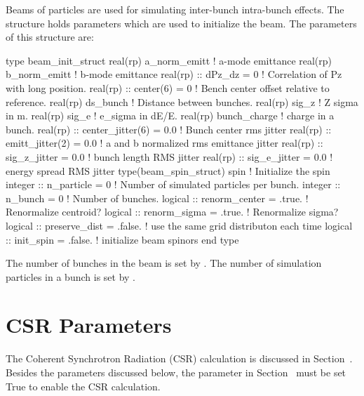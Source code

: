 Beams of particles are used for simulating inter-bunch intra-bunch effects.
The  structure holds parameters which are used to initialize
the beam. The parameters of this structure are:
\begin{example}
  type beam_init_struct
    real(rp) a_norm_emitt     ! a-mode emittance
    real(rp) b_norm_emitt     ! b-mode emittance
    real(rp) :: dPz_dz = 0    ! Correlation of Pz with long position.
    real(rp) :: center(6) = 0 ! Bench center offset relative to reference.
    real(rp) ds_bunch         ! Distance between bunches.
    real(rp) sig_z            ! Z sigma in m.
    real(rp) sig_e            ! e_sigma in dE/E.
    real(rp) bunch_charge     ! charge in a bunch.
    real(rp) :: center_jitter(6) = 0.0 ! Bunch center rms jitter
    real(rp) :: emitt_jitter(2)  = 0.0 ! a and b normalized rms emittance jitter
    real(rp) :: sig_z_jitter     = 0.0 ! bunch length RMS jitter 
    real(rp) :: sig_e_jitter     = 0.0 ! energy spread RMS jitter 
    type(beam_spin_struct)  spin       ! Initialize the spin
    integer :: n_particle = 0          ! Number of simulated particles per bunch.
    integer :: n_bunch = 0             ! Number of bunches.
    logical :: renorm_center = .true.  ! Renormalize centroid?
    logical :: renorm_sigma = .true.   ! Renormalize sigma?
    logical :: preserve_dist = .false. ! use the same grid distributon each time
    logical :: init_spin     = .false. ! initialize beam spinors
  end type
\end{example}
The number of bunches in the beam is set by . 
The number of simulation particles in a bunch is set by .


\section{CSR Parameters}
\label{s:csr_params}

The Coherent Synchrotron Radiation (CSR) calculation is discussed in
Section~. Besides the parameters discussed below, the
 parameter in Section~
must be set True to enable the CSR calculation.

